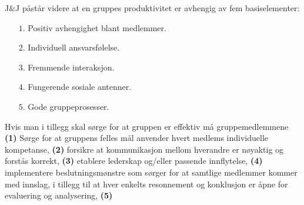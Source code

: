 J\&J påstår videre at en gruppes produktivitet er avhengig av fem
basiselementer:
\begin{itemize}
\item[$1.$] Positiv avhengighet blant medlemmer.
\item[$2.$] Individuell ansvarsfølelse.
\item[$3.$] Fremmende interaksjon.
\item[$4.$] Fungerende sosiale antenner.
\item[$5.$] Gode gruppeprosesser.
\end{itemize}
Hvis man i tillegg skal sørge for at gruppen er effektiv må gruppemedlemmene
\textbf{(1)} Sørge for at gruppens felles mål anvender hvert medlems
individuelle kompetanse, \textbf{(2)} forsikre at kommunikasjon mellom hverandre
er nøyaktig og forstås korrekt, \textbf{(3)} etablere lederskap og/eller
passende innflytelse, \textbf{(4)} implementere beslutningsmønstre som sørger
for at samtlige medlemmer kommer med innslag, i tillegg til at hver enkelts
resonnement og konklusjon er åpne for evaluering og analysering, \textbf{(5)} 



